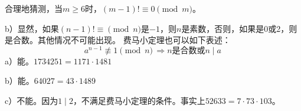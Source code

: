 合理地猜测，当$m\ge6$时，$(m-1)!\equiv 0\pmod m$。\par
b）显然，如果$(n-1)!\equiv \pmod n$是$-1$，则$n$是素数，否则，如果是0或2，则是合数。其他情况不可能出现。
%
\exercise 费马小定理也可以如下表述：
\[a^{n-1}\not\equiv 1\pmod n\,\Rightarrow n\text{是合数或}n\mid a\,\]
a）能。$1734251=1171\cdot1481$\par
b）能。$64027 = 43\cdot 1489$\par
c）不能。因为$1\mid 2$，不满足费马小定理的条件。事实上$52633=7\cdot 73\cdot 103$。